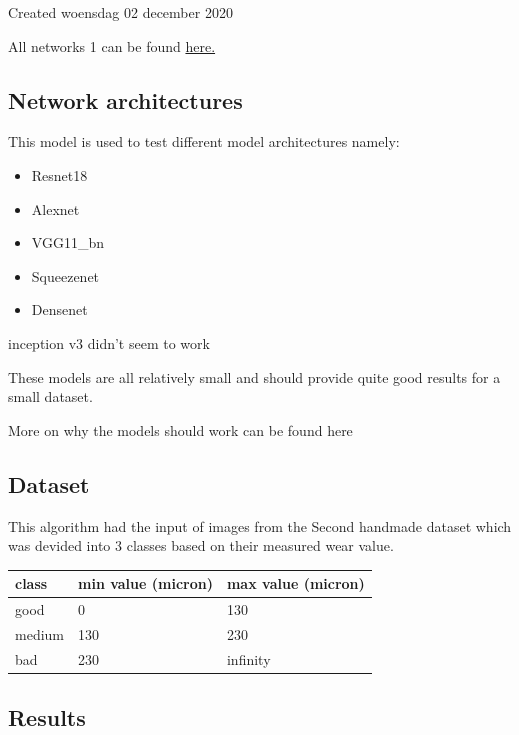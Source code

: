 Created woensdag 02 december 2020



All networks 1 can be found \href{https://colab.research.google.com/drive/1bWt0DgypiYoOOgnSGjlmSdDo7elvJnH4}{here.}



\subsection{Network architectures}

This model is used to test different model architectures namely:

\begin{itemize}
\item Resnet18
\item Alexnet
\item VGG11\_bn
\item Squeezenet
\item Densenet
\end{itemize}


inception v3 didn't seem to work



These models are all relatively small and should provide quite good results for a small dataset. 

More on why the models should work can be found here



\subsection{Dataset}



This algorithm had the input of images from the Second handmade dataset which was devided into 3 classes based on their measured wear value. 

\begin{tabular}{ |l|l|l| }
\hline
 class & min value (micron) & max value (micron) \tabularnewline
\hline
\hline
 good & 0 & 130 \tabularnewline
\hline
 medium & 130 & 230 \tabularnewline
\hline
 bad & 230 & infinity \tabularnewline
\hline
\end{tabular}










\subsection{Results}

